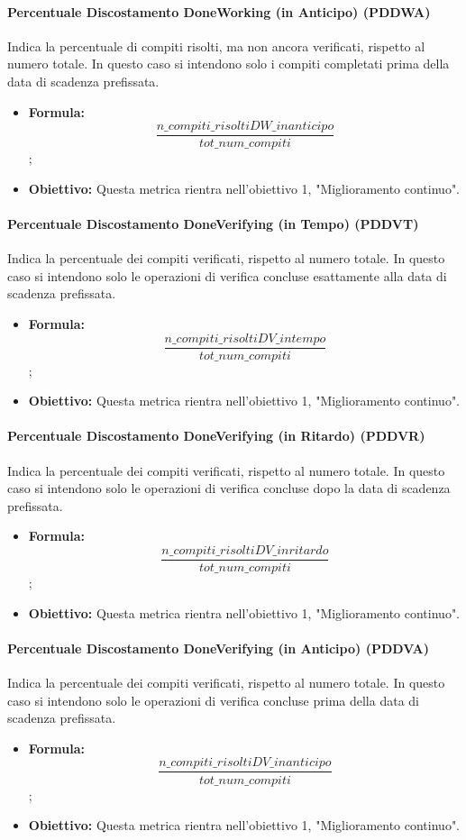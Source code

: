 	\paragraph{Percentuale Discostamento DoneWorking (in Anticipo) (PDDWA)}
	Indica la percentuale di compiti risolti, ma non ancora verificati, rispetto al numero totale. In questo caso si intendono solo i compiti completati prima della data di scadenza prefissata.
	\begin{itemize}
		\item \textbf{Formula:}\[\frac{n\_compiti\_risoltiDW\_inanticipo}{tot\_num\_compiti}\];
		\item \textbf{Obiettivo:} Questa metrica rientra nell'obiettivo 1, "Miglioramento continuo".
	\end{itemize}
	
	\paragraph{Percentuale Discostamento DoneVerifying (in Tempo) (PDDVT)}
	Indica la percentuale dei compiti verificati, rispetto al numero totale. In questo caso si intendono solo le operazioni di verifica concluse esattamente alla data di scadenza prefissata.
	\begin{itemize}
		\item \textbf{Formula:}\[\frac{n\_compiti\_risoltiDV\_intempo}{tot\_num\_compiti}\];
		\item \textbf{Obiettivo:} Questa metrica rientra nell'obiettivo 1, "Miglioramento continuo".
	\end{itemize}
	
	\paragraph{Percentuale Discostamento DoneVerifying (in Ritardo) (PDDVR)}
	Indica la percentuale dei compiti verificati, rispetto al numero totale. In questo caso si intendono solo le operazioni di verifica concluse dopo la data di scadenza prefissata.
	\begin{itemize}
		\item \textbf{Formula:}\[\frac{n\_compiti\_risoltiDV\_inritardo}{tot\_num\_compiti}\];
		\item \textbf{Obiettivo:} Questa metrica rientra nell'obiettivo 1, "Miglioramento continuo".
	\end{itemize}
	
	\paragraph{Percentuale Discostamento DoneVerifying (in Anticipo) (PDDVA)}
	Indica la percentuale dei compiti verificati, rispetto al numero totale. In questo caso si intendono solo le operazioni di verifica concluse prima della data di scadenza prefissata.
	\begin{itemize}
		\item \textbf{Formula:}\[\frac{n\_compiti\_risoltiDV\_inanticipo}{tot\_num\_compiti}\];
		\item \textbf{Obiettivo:} Questa metrica rientra nell'obiettivo 1, "Miglioramento continuo".
	\end{itemize}
	
